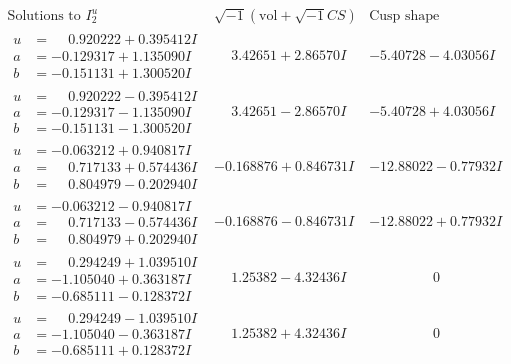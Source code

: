 \documentclass[1p]{elsarticle_modified}
\theoremstyle{definition}
\newcommand{\I}{\sqrt{-1}}
\begin{document}
$$\begin{array}{c|c|c}  
\text{Solutions to }I^u_{2}& \I (\text{vol} + \sqrt{-1}CS) & \text{Cusp shape}\\
 \hline 
\begin{aligned}
u &= \phantom{-}0.920222 + 0.395412 I \\
a &= -0.129317 + 1.135090 I \\
b &= -0.151131 + 1.300520 I\end{aligned}
 & \phantom{-}3.42651 + 2.86570 I & -5.40728 - 4.03056 I \\ \hline\begin{aligned}
u &= \phantom{-}0.920222 - 0.395412 I \\
a &= -0.129317 - 1.135090 I \\
b &= -0.151131 - 1.300520 I\end{aligned}
 & \phantom{-}3.42651 - 2.86570 I & -5.40728 + 4.03056 I \\ \hline\begin{aligned}
u &= -0.063212 + 0.940817 I \\
a &= \phantom{-}0.717133 + 0.574436 I \\
b &= \phantom{-}0.804979 - 0.202940 I\end{aligned}
 & -0.168876 + 0.846731 I & -12.88022 - 0.77932 I \\ \hline\begin{aligned}
u &= -0.063212 - 0.940817 I \\
a &= \phantom{-}0.717133 - 0.574436 I \\
b &= \phantom{-}0.804979 + 0.202940 I\end{aligned}
 & -0.168876 - 0.846731 I & -12.88022 + 0.77932 I \\ \hline\begin{aligned}
u &= \phantom{-}0.294249 + 1.039510 I \\
a &= -1.105040 + 0.363187 I \\
b &= -0.685111 - 0.128372 I\end{aligned}
 & \phantom{-}1.25382 - 4.32436 I & \phantom{-0.000000 } 0 \\ \hline\begin{aligned}
u &= \phantom{-}0.294249 - 1.039510 I \\
a &= -1.105040 - 0.363187 I \\
b &= -0.685111 + 0.128372 I\end{aligned}
 & \phantom{-}1.25382 + 4.32436 I & \phantom{-0.000000 } 0 \\ \hline\begin{aligned}

\end{aligned}
\end{array}$$
\end{document}
